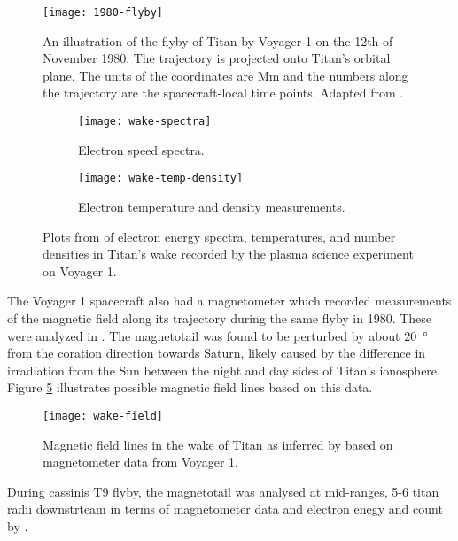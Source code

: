 \documentclass[12pt, parskip=full*, abstract]{scrartcl}
\begin{document}
\begin{figure}[htbp]
	\centering
	\texttt{[image: 1980-flyby]}
	\caption{An illustration of the flyby of Titan by Voyager 1 on the 12th of November 1980. The trajectory is projected onto Titan's orbital plane. The units of the coordinates are \si{\mega\metre} and the numbers along the trajectory are the spacecraft-local time points. Adapted from \textcite{hartle-1982}.}
	\label{fig:1980-flyby}
\end{figure}


\begin{figure}[htbp]
	\begin{subfigure}{\textwidth}
		\centering
		\texttt{[image: wake-spectra]}
		\caption{Electron speed spectra.}
		\label{fig:wake-spectra}	
	\end{subfigure}
	\begin{subfigure}{\textwidth}
		\centering
		\texttt{[image: wake-temp-density]}
		\caption{Electron temperature and density measurements.}
		\label{fig:wake-temp-density}
	\end{subfigure}
	\caption{Plots from \textcite{hartle-1982} of electron energy spectra, temperatures, and number densities in Titan's wake recorded by the plasma science experiment on Voyager 1.}
\end{figure}

The Voyager 1 spacecraft also had a magnetometer which recorded measurements of the magnetic field along its trajectory during the same flyby in 1980. These were analyzed in \textcite{ness-1982}. The magnetotail was found to be perturbed by about \SI{20}{\degree} from the coration direction towards Saturn, likely caused by the difference in irradiation from the Sun between the night and day sides of Titan's ionosphere. Figure \ref{fig:wake-field} illustrates possible magnetic field lines based on this data.

\begin{figure}[htbp]
	\centering
	\texttt{[image: wake-field]}
	\caption{Magnetic field lines in the wake of Titan as inferred by \textcite{ness-1982} based on magnetometer data from Voyager 1.}
	\label{fig:wake-field}
\end{figure}


During cassinis T9 flyby, the magnetotail was analysed at mid-ranges, 5-6 titan radii downstrteam in terms of magnetometer data and electron enegy and count by \textcite{Magnetotail-T9}.                                     
\end{document}
